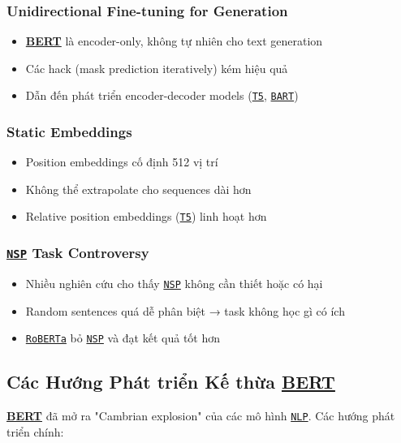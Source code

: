 \subsubsection{Unidirectional Fine-tuning for Generation}
\begin{itemize}
    \item \hyperref[acro:bert]{\textbf{BERT}} là encoder-only, không tự nhiên cho
    text generation
    \item Các hack (mask prediction iteratively) kém hiệu quả
    \item Dẫn đến phát triển encoder-decoder models (\hyperref[acro:t5]{\texttt{T5}}, \hyperref[acro:bart]{\texttt{BART}})
\end{itemize}

\subsubsection{Static Embeddings}
\begin{itemize}
    \item Position embeddings cố định 512 vị trí
    \item Không thể extrapolate cho sequences dài hơn
    \item Relative position embeddings (\hyperref[acro:t5]{\texttt{T5}}) linh hoạt hơn
\end{itemize}

\subsubsection{\hyperref[acro:nsp]{\texttt{NSP}} Task Controversy}
\begin{itemize}
    \item Nhiều nghiên cứu cho thấy \hyperref[acro:nsp]{\texttt{NSP}} không cần thiết hoặc có hại
    \item Random sentences quá dễ phân biệt → task không học gì có ích
    \item \hyperref[acro:roberta]{\texttt{RoBERTa}}
    bỏ \hyperref[acro:nsp]{\texttt{NSP}} và đạt kết quả tốt hơn
\end{itemize}

\subsection{Các Hướng Phát triển Kế thừa \hyperref[acro:bert]{\textbf{BERT}}}
\label{ssec:huong_phat_trien_ke_thua}
\hyperref[acro:bert]{\textbf{BERT}} đã mở ra "Cambrian explosion" của các mô hình \hyperref[acro:nlp]{\texttt{NLP}}.
Các hướng phát triển chính:

